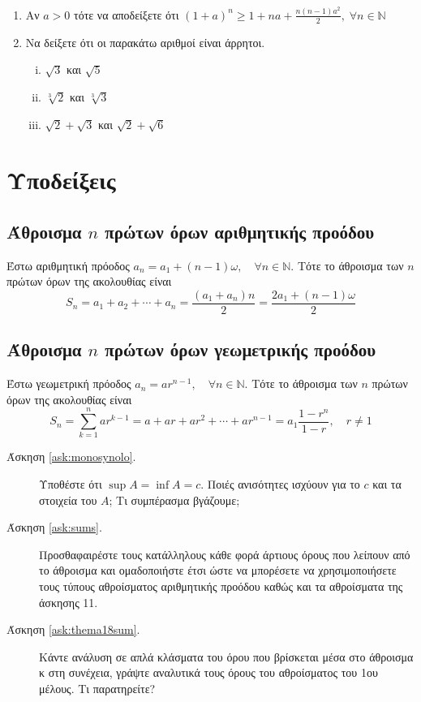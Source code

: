 \begin{enumerate}
    \item Αν $a > 0$ τότε να αποδείξετε ότι $ (1+a)^{n} \geq 1 + na + 
      \frac{n(n-1)a^{2}}{2},\; \forall n \in \mathbb{N}   $ 

    \item Να δείξετε ότι οι παρακάτω αριθμοί είναι άρρητοι.
      \begin{enumerate}[i)]
        \item $ \sqrt{3} $ και  $ \sqrt{5} $
        \item $ \sqrt[3]{2} $ και $ \sqrt[3]{3} $
        \item $ \sqrt{2} + \sqrt{3} $ και $ \sqrt{2} + \sqrt{6} $ 
      \end{enumerate}
  \end{enumerate}

  \vspace{\baselineskip}

  \section*{Υποδείξεις} 

  \subsection*{Άθροισμα $n$ πρώτων όρων αριθμητικής προόδου}
  Έστω αριθμητική πρόοδος $a_{n} = a_{1} + (n-1)\omega, \quad \forall n \in \mathbb{N}$.
  Τότε το άθροισμα των $n$ πρώτων όρων της ακολουθίας είναι
  \[
    S_{n} = a_{1} + a_{2} + \cdots + a_{n} = \frac{(a_{1} + a_{n})n}{2} =
    \frac{2a_{1}+(n-1)\omega}{2}
  \]
  \subsection*{Άθροισμα $n$ πρώτων όρων γεωμετρικής προόδου}
  Έστω γεωμετρική πρόοδος $ a_{n} = a r^{n-1}, \quad \forall n \in \mathbb{N} $.
  Τότε το άθροισμα των $n$ πρώτων όρων της ακολουθίας είναι
  \[
    S_{n} = \sum_{k=1}^{n} ar^{k-1} = a + ar + ar^{2} + \cdots + ar^{n-1} = 
    a_{1}\frac{1 - r^{n}}{1-r}, \quad r \neq 1 
  \] 

  \begin{description}
    \item [Άσκηση \ref{ask:monosynolo}.] Υποθέστε ότι $ \sup A = \inf A = c
      $. Ποιές ανισότητες ισχύουν για το $c$ και τα στοιχεία του $A$; 
      Τι συμπέρασμα βγάζουμε;

    \item [Άσκηση \ref{ask:sums}.] Προσθαφαιρέστε τους κατάλληλους κάθε φορά  
      άρτιους όρους που λείπουν από το άθροισμα και ομαδοποιήστε έτσι ώστε να 
      μπορέσετε να χρησιμοποιήσετε τους τύπους αθροίσματος αριθμητικής προόδου 
      καθώς και τα αθροίσματα της άσκησης 11.

    \item [Άσκηση \ref{ask:thema18sum}.] Κάντε ανάλυση σε απλά κλάσματα 
      του όρου που βρίσκεται μέσα στο άθροισμα κ στη συνέχεια, γράψτε
      αναλυτικά τους όρους του αθροίσματος του 1ου μέλους. Τι παρατηρείτε?
  \end{description}
  
